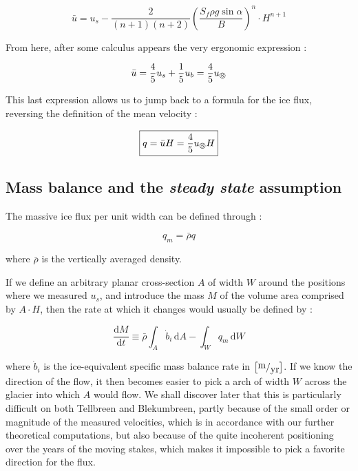 \begin{equation}\bar{u} = u_s - \frac{2}{(n+1)(n+2)} \left( \frac{S_f \rho g \sin{\alpha}}{B}\right)^n \cdot H^{n+1}\end{equation}

From here, after some calculus appears the very ergonomic expression :

\begin{equation}\bar{u} = \frac{4}{5}u_s + \frac{1}{5}u_b = \frac{4}{5}u_\circledS\end{equation}

This last expression allows us to jump back to a formula for the ice flux, reversing the definition of the mean velocity :

\begin{equation}
\boxed{q = \bar{u}H = \frac{4}{5}u_\circledS H}
\end{equation}


\subsection*{Mass balance and the \textit{steady state} assumption}

The massive ice flux per unit width can be defined through :

\begin{equation}q_m = \bar{\rho}q\end{equation}

where $\bar{\rho}$ is the vertically averaged density.

If we define an arbitrary planar cross-section $A$ of width $W$ around the positions where we measured $u_s$, and introduce the mass $M$ of the volume area comprised by $A \cdot H$, then the rate at which it changes would usually be defined \cite{Cuffey2010} by :
 
\begin{equation} \frac{\mathrm{d} M}{\mathrm{d}t} \equiv \bar{\rho} \int_A \dot{b}_i \, \mathrm{d}A - \int_W q_m \, \mathrm{d} W \end{equation}

where $\dot{b}_i$ is the ice-equivalent specific mass balance rate in $\left[ \fraction{m}{yr} \right]$. If we know the direction of the flow, it then becomes easier to pick a arch of width $W$ across the glacier into which $A$ would flow. We shall discover later that this is particularly difficult on both Tellbreen and Blekumbreen, partly because of the small order or magnitude of the measured velocities, which is in accordance with our further theoretical computations, but also because of the quite incoherent positioning over the years of the moving stakes, which makes it impossible to pick a favorite direction for the flux.

